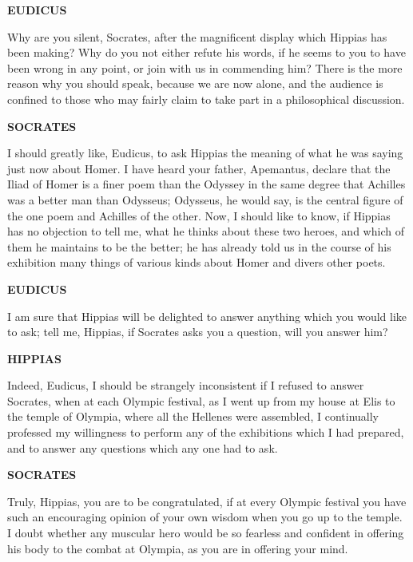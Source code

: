 \documentclass[11pt,letter]{article}
\begin{document}
\par \textbf{EUDICUS}
\par   Why are you silent, Socrates, after the magnificent display which Hippias has been making? Why do you not either refute his words, if he seems to you to have been wrong in any point, or join with us in commending him? There is the more reason why you should speak, because we are now alone, and the audience is confined to those who may fairly claim to take part in a philosophical discussion.

\par \textbf{SOCRATES}
\par   I should greatly like, Eudicus, to ask Hippias the meaning of what he was saying just now about Homer. I have heard your father, Apemantus, declare that the Iliad of Homer is a finer poem than the Odyssey in the same degree that Achilles was a better man than Odysseus; Odysseus, he would say, is the central figure of the one poem and Achilles of the other. Now, I should like to know, if Hippias has no objection to tell me, what he thinks about these two heroes, and which of them he maintains to be the better; he has already told us in the course of his exhibition many things of various kinds about Homer and divers other poets.

\par \textbf{EUDICUS}
\par   I am sure that Hippias will be delighted to answer anything which you would like to ask; tell me, Hippias, if Socrates asks you a question, will you answer him?

\par \textbf{HIPPIAS}
\par   Indeed, Eudicus, I should be strangely inconsistent if I refused to answer Socrates, when at each Olympic festival, as I went up from my house at Elis to the temple of Olympia, where all the Hellenes were assembled, I continually professed my willingness to perform any of the exhibitions which I had prepared, and to answer any questions which any one had to ask.

\par \textbf{SOCRATES}
\par   Truly, Hippias, you are to be congratulated, if at every Olympic festival you have such an encouraging opinion of your own wisdom when you go up to the temple. I doubt whether any muscular hero would be so fearless and confident in offering his body to the combat at Olympia, as you are in offering your mind.
\end{document}
